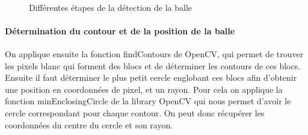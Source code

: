 \begin{figure}
\centering
{}
\\
\caption{Différentes étapes de la détection de la balle}
\label{3figs}
\end{figure}

\paragraph{Détermination du contour et de la position de la balle\\}

On applique ensuite la fonction findContours de OpenCV, qui permet de trouver les pixels blanc qui forment des blocs et de déterminer les contours de ces blocs. Ensuite il faut déterminer le plus petit cercle englobant ces blocs afin d'obtenir une position en coordonnées de pixel, et un rayon. Pour cela on applique la fonction minEnclosingCircle de la library OpenCV qui nous permet d'avoir le cercle correspondant pour chaque contour. On peut donc récupérer les coordonnées du centre du cercle et son rayon.\\


